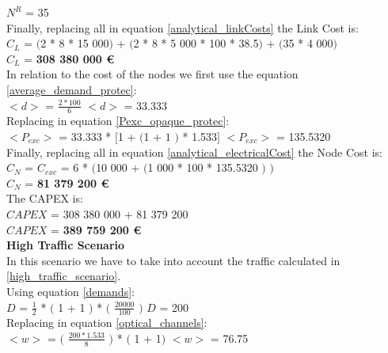 $N^R$ = 35\\

Finally, replacing all in equation \ref{analytical_linkCosts} the Link Cost is:\\

$C_L$ = $($2 * 8 * 15 000$)$ + $($2 * 8 * 5 000 * 100 * 38.5$)$ + $($35 * 4 000$)$\\

$C_L$ = \textbf{308 380 000 \euro}\\

In relation to the cost of the nodes we first use the equation \ref{average_demand_protec}:\\

$<d>$ = $\frac{2 * 100}{6}$ \qquad \qquad $<d>$ = 33.333\\

Replacing in equation \ref{Pexc_opaque_protec}:\\

$<P_{exc}>$ = 33.333 * $[$1 + $($1 + $1$ $)$ * 1.533$]$ \qquad \quad $<P_{exc}>$ = 135.5320 \\

Finally, replacing all in equation \ref{analytical_electricalCost} the Node Cost is:\\

$C_N$ = $C_{exc}$ = 6 * $($10 000 + $($1 000 * 100 * 135.5320 $)$ $)$\\

$C_N$ = \textbf{81 379 200 \euro}\\

The CAPEX is:\\
$CAPEX$ = 308 380 000 + 81 379 200\\

$CAPEX$ = \textbf{389 759 200 \euro}\\

\textbf{High Traffic Scenario}\\
In this scenario we have to take into account the traffic calculated in \ref{high_traffic_scenario}.\\

Using equation \ref{demands}:\\

$D$ = $\frac{1}{2}$ * $($ 1 + 1 $)$ * $($ $\frac{20000}{100}$ $)$ \qquad \qquad $D$ = 200\\

Replacing in equation \ref{optical_channels}:\\

$<w>$ = $($ $\frac{200 * 1.533}{8}$ $)$ * $($ 1 + 1$)$ \qquad \qquad $<w>$ = 76.75\\

